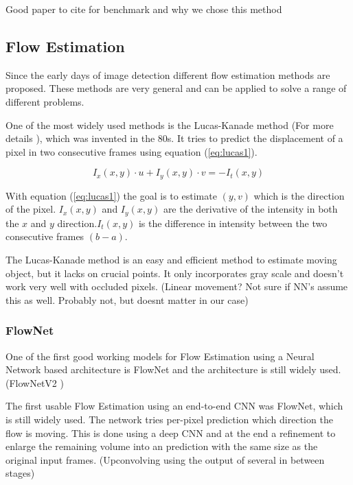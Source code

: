 Good paper to cite for benchmark and why we chose this method
\cite{wang2020nwpu}
\cite{li2018csrnet}



\subsection{Flow Estimation}
Since the early days of image detection different flow estimation methods are proposed. These methods are very general and can be applied to solve a range of different problems.

One of the most widely used methods is the Lucas-Kanade method (For more details \cite{lucas_kan_nutshell}), which was invented in the 80s. It tries to predict the displacement of a pixel in two consecutive frames using equation (\ref{eq:lucas1}).

\begin{equation} \label{eq:lucas1}
I_x(x, y) \cdot u + I_y(x,y) \cdot v = -I_t(x,y)
\end{equation}

With equation (\ref{eq:lucas1}) the goal is to estimate $(y, v)$ which is the direction of the pixel. $I_x(x, y)$ and $I_y(x, y)$ are the derivative of the intensity in both the $x$ and $y$ direction.$I_t(x, y)$ is the difference in intensity between the two consecutive frames $(b-a)$.

The Lucas-Kanade method is an easy and efficient method to estimate moving object, but it lacks on crucial points. It only incorporates gray scale and doesn't work very well with occluded pixels. (Linear movement? Not sure if NN's assume this as well. Probably not, but doesnt matter in our case)

\subsubsection{FlowNet}
One of the first good working models for Flow Estimation using a Neural Network based architecture is FlowNet \cite{fischer_flownet_2015} and the architecture is still widely used. (FlowNetV2 \cite{ilg_flownet_2016})

The first usable Flow Estimation using an end-to-end CNN was FlowNet, which is still widely used. The network tries per-pixel prediction which direction the flow is moving. This is done using a deep CNN and at the end a refinement to enlarge the remaining volume into an prediction with the same size as the original input frames. (Upconvolving using the output of several in between stages)

